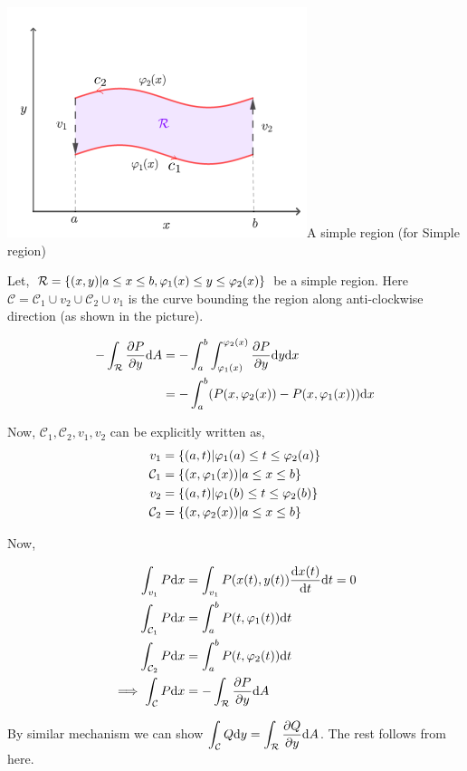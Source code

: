 \documentclass[../Analysis-3.tex]{subfiles}
\begin{document}
\begin{proofFig}{\includegraphics[width=.78\linewidth]{../figures/lec-28.1.png}}{A simple region} (for Simple region)

  Let, $\mathcal{R} = \qty{(x,y) | a\le x\le b, \varphi_1(x) \le y \le \varphi_2(x)}$ be a simple region. Here $\mathcal{C} = \mathcal{C}_1 \cup v_2 \cup \mathcal{C}_2 \cup v_1$ is the curve bounding the region along anti-clockwise direction (as shown in the picture).

  \begin{align*}
    -\int_{\mathcal{R}} \pdv{P}{y} \dd A & = -\int_{a}^{b} \int_{\varphi_1(x)}^{\varphi_2(x)} \pdv{P}{y} \dd y \dd x \\
                                         & = - \int_{a}^{b} (P(x,\varphi_2(x))-P(x,\varphi_1(x))) \dd x              \\
  \end{align*}

  Now, $\mathcal{C}_1,\mathcal{C}_2,v_1,v_2$ can be explicitly written as,
  \begin{align*}
    v_1           & = \qty{(a,t) | \varphi_1(a) \le t \le \varphi_2(a)} \\
    \mathcal{C}_1 & = \qty{(x,\varphi_1(x)) | a \le x \le b}            \\
    v_2           & = \qty{(a,t) | \varphi_1(b) \le t \le \varphi_2(b)} \\
    \mathcal{C}_2 & = \qty{(x,\varphi_2(x)) | a \le x \le b}
  \end{align*}

  Now,

  \begin{align*}
    \int_{v_1} P \dd x                 & = \int_{v_1} P(x(t),y(t)) \dv{x(t)}{t} \dd t = 0 \\
    \int_{\mathcal{C}_1} P \dd x       & = \int_{a}^{b} P(t,\varphi_1(t)) \dd t           \\
    \int_{\mathcal{C}_2} P \dd x       & = \int_{a}^{b} P(t,\varphi_2(t)) \dd t           \\
    \implies \int_{\mathcal{C}} P\dd x & = -\int_{\mathcal{R}} \pdv{P}{y} \dd A
  \end{align*}


  By similar mechanism we can show $\displaystyle\int_{\mathcal{C}} Q \dd y = \int_{\mathcal{R}} \pdv{Q}{y} \dd A$. The rest follows from here.
\end{proofFig}
\end{document}

